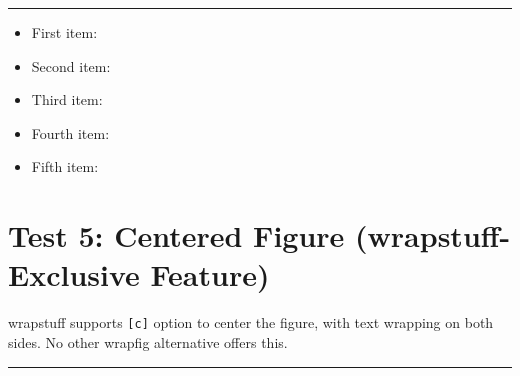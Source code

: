 \documentclass[a4paper,11pt]{article}
\begin{document}
\begin{wrapstuff}[r,width=0.35\linewidth,type=figure]
  \centering
  \rule{0.3\linewidth}{3cm}
  \caption{Figure inside itemize environment.}
\end{wrapstuff}
\begin{itemize}
  \item First item: \lipsum[1][1-3]
  \item Second item: \lipsum[2][1-3]
  \item Third item: \lipsum[3][1-3]
  \item Fourth item: \lipsum[4][1-3]
  \item Fifth item: \lipsum[5][1-3]
\end{itemize}

\section*{Test 5: Centered Figure (wrapstuff-Exclusive Feature)}
wrapstuff supports \verb|[c]| option to center the figure,
with text wrapping on both sides. No other wrapfig alternative offers this.

\begin{wrapstuff}[c,width=0.25\linewidth,type=figure]
  \centering
  \rule{0.2\linewidth}{4cm}
  \caption{Centered figure with text on both sides.}
\end{wrapstuff}
\lipsum[6-7]
\end{document}
